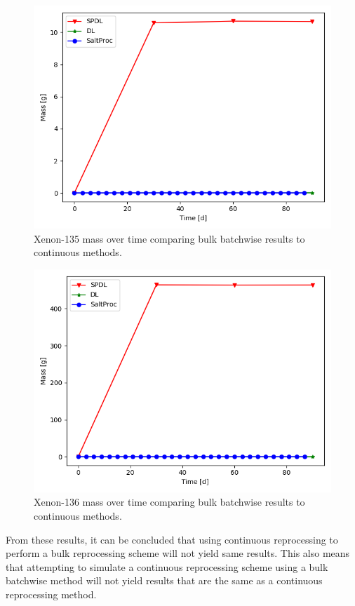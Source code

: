 \begin{figure}[H]
  \centering
  \includegraphics[scale=0.7]{images/soln-3-Xe135.png}
  \caption{Xenon-135 mass over time comparing bulk batchwise results to continuous methods.}
   \label{fig:bulk-comapre-xe135}
\end{figure}

\begin{figure}[H]
  \centering
  \includegraphics[scale=0.7]{images/soln-3-Xe136.png}
  \caption{Xenon-136 mass over time comparing bulk batchwise results to continuous methods.}
   \label{fig:bulk-comapre-xe136}
\end{figure}

From these results, it can be concluded that using continuous reprocessing to perform a bulk reprocessing scheme will not yield same results. This also means that attempting to simulate a continuous reprocessing scheme using a bulk batchwise method will not yield results that are the same as a continuous reprocessing method.


